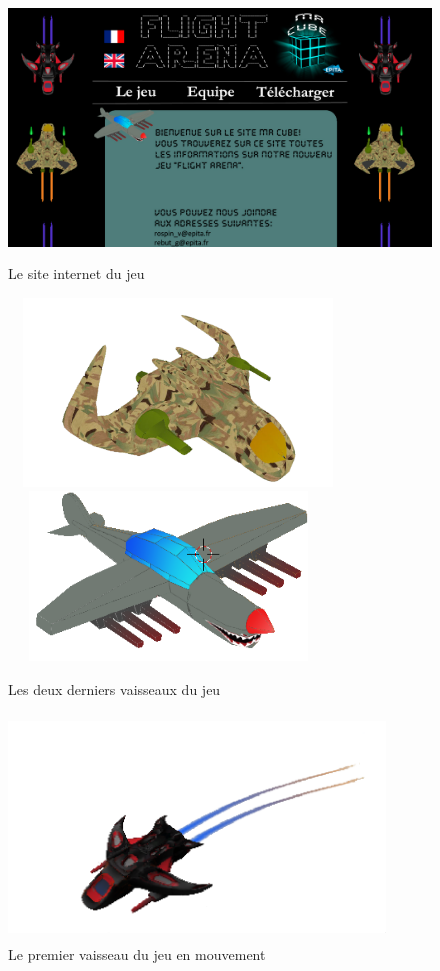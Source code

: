\documentclass[12pt, titlepage]{article}
\begin{document}
\begin{spacing}{1.5}
\begin{figure}[h]
\center
\includegraphics[height=7cm, width=12cm]{site.png}
\caption{Le site internet du jeu}
\end{figure}

\begin{figure}[h]
\center
\includegraphics[height=5cm, width=9cm]{vaisseau2.png}
\includegraphics[height=4.5cm, width=8.5cm]{sharknado.png}
\caption{Les deux derniers vaisseaux du jeu}
\end{figure}

\begin{figure}[h]
\center
\includegraphics[height=6cm, width=10cm]{vaisseau_bouge.png}
\caption{Le premier vaisseau du jeu en mouvement}
\end{figure}

\end{spacing}
\end{document}
